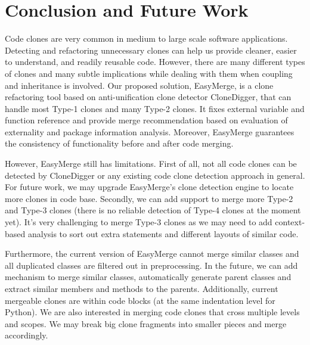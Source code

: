 \documentclass{acm_proc_article-sp}
\begin{document}
\section{Conclusion and Future Work}
Code clones are very common in medium to large scale software applications.
Detecting and refactoring unnecessary clones can help us provide cleaner, easier to understand, and readily reusable code.
However, there are many different types of clones and many subtle implications while dealing with them when coupling and
inheritance is involved. Our proposed solution, EasyMerge, is a clone refactoring tool based on anti-unification clone detector 
CloneDigger, that can handle most Type-1 clones and many Type-2 clones. It fixes external variable and function reference
and provide merge recommendation based on evaluation of externality and package information analysis.
Moreover, EasyMerge guarantees the consistency of functionality before and after code merging.

However, EasyMerge still has limitations. First of all, not all code clones can be detected by CloneDigger or any existing
code clone detection approach in general. For future work, we may upgrade EasyMerge's clone detection engine to locate
more clones in code base. Secondly, we can add support to merge more Type-2 and Type-3 clones (there is no reliable detection of Type-4 clones at the moment yet).
It's very challenging to merge Type-3 clones as we may need to add context-based analysis to sort out extra statements and different layouts of similar code.

Furthermore, the current version of EasyMerge cannot merge similar classes and all duplicated classes are filtered out in preprocessing.
In the future, we can add mechanism to merge similar classes, automatically generate parent classes and extract similar members and methods to the parents.
Additionally, current mergeable clones are within code blocks (at the same indentation level for Python). We are also interested in merging code clones that cross
multiple levels and scopes. We may break big clone fragments into smaller pieces and merge accordingly.



\end{document}
